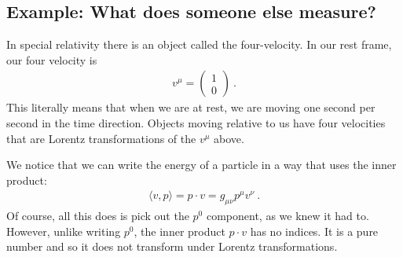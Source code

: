 \documentclass[12pt, oneside]{report}    %
\begin{document}
\subsection{Example: What does someone else measure?}
\label{sec:relativity:alien}


In special relativity there is an object called the four-velocity. In our rest frame, our four velocity is
\begin{align}
    v^\mu = \begin{pmatrix}
        1\\ 0
    \end{pmatrix} \ .
    \label{eq:4:velocity:in:rest:Frame}
\end{align}
This literally means that when we are at rest, we are moving one second per second in the time direction. Objects moving relative to us have four velocities that are Lorentz transformations of the $v^\mu$ above. 

We notice that we can write the energy of a particle in a way that uses the inner product:
\begin{align}
    \langle v, p\rangle = p\cdot v = g_{\mu\nu} p^\mu v^\nu \ .
\end{align}
Of course, all this does is pick out the $p^0$ component, as we knew it had to. However, unlike writing $p^0$, the inner product $p\cdot v$ has no indices. It is a pure number and so it does not transform under Lorentz transformations. 
\end{document}
